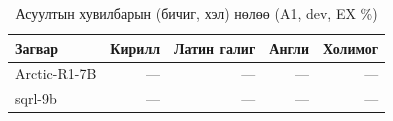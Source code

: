 \begin{table}[H]\centering\small
\caption{Асуултын хувилбарын (бичиг, хэл) нөлөө (A1, dev, EX \%)}\label{tab:scripts}
\begin{tabular}{lrrrr}\toprule Загвар & Кирилл & Латин галиг & Англи & Холимог \\\midrule
Arctic-R1-7B & — & — & — & — \\
sqrl-9b & — & — & — & — \\
\bottomrule\end{tabular}\end{table}
